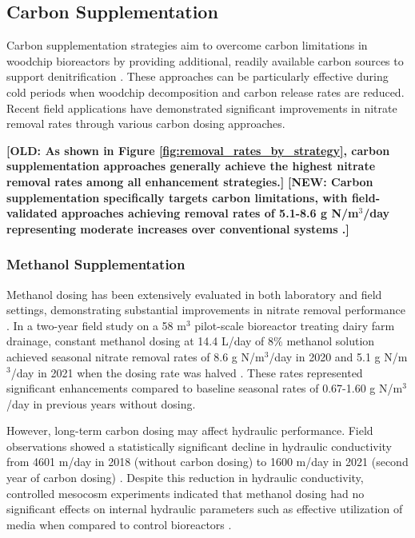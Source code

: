 \documentclass[12pt,a4paper]{article}
\newcommand{\replaced}[2]{\textcolor{deletedtext}{\textbf{[OLD: #1]}} \textcolor{replacedtext}{\textbf{[NEW: #2]}}}
\begin{document}
\subsection{Carbon Supplementation}

Carbon supplementation strategies aim to overcome carbon limitations in woodchip bioreactors by providing additional, readily available carbon sources to support denitrification \citep{RN635, RN632}. These approaches can be particularly effective during cold periods when woodchip decomposition and carbon release rates are reduced. Recent field applications have demonstrated significant improvements in nitrate removal rates through various carbon dosing approaches.

\replaced{As shown in Figure \ref{fig:removal_rates_by_strategy}, carbon supplementation approaches generally achieve the highest nitrate removal rates among all enhancement strategies.}{Carbon supplementation specifically targets carbon limitations, with field-validated approaches achieving removal rates of 5.1-8.6 g N/m$^3$/day representing moderate increases over conventional systems \citep{RN632}.}

\subsubsection{Methanol Supplementation}

Methanol dosing has been extensively evaluated in both laboratory and field settings, demonstrating substantial improvements in nitrate removal performance \citep{RN632}. In a two-year field study on a 58 m$^3$ pilot-scale bioreactor treating dairy farm drainage, constant methanol dosing at 14.4 L/day of 8\% methanol solution achieved seasonal nitrate removal rates of 8.6 g N/m$^3$/day in 2020 and 5.1 g N/m$^3$/day in 2021 when the dosing rate was halved \citep{RN632}. These rates represented significant enhancements compared to baseline seasonal rates of 0.67-1.60 g N/m$^3$/day in previous years without dosing.

However, long-term carbon dosing may affect hydraulic performance. Field observations showed a statistically significant decline in hydraulic conductivity from 4601 m/day in 2018 (without carbon dosing) to 1600 m/day in 2021 (second year of carbon dosing) \citep{RN632}. Despite this reduction in hydraulic conductivity, controlled mesocosm experiments indicated that methanol dosing had no significant effects on internal hydraulic parameters such as effective utilization of media when compared to control bioreactors \citep{RN632}.
\end{document}
